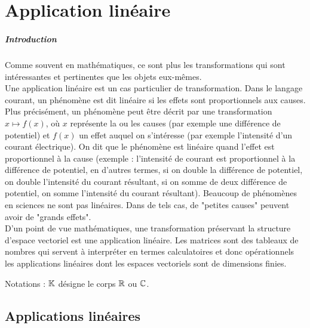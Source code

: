 \documentclass{book}
\begin{document}
\chapter*{Application linéaire}
\paragraph{Introduction}
Comme souvent en mathématiques, ce sont plus les transformations qui sont intéressantes et pertinentes que les objets eux-mêmes.\\
Une application linéaire est un cas particulier de transformation.  Dans le langage courant, un phénomène est dit linéaire si les
effets sont proportionnels aux causes. \\
Plus précisément, un phénomène peut être décrit par une transformation$x \mapsto f (x)$, où $x$ représente la ou les causes (par exemple une différence de
potentiel) et $f(x)$ un effet auquel on s'intéresse (par exemple l'intensité
d'un courant électrique). On dit que le phénomène est linéaire quand  l'effet est proportionnel à la cause (exemple : l'intensité de courant est
proportionnel à la différence de potentiel, en d'autres termes, si on double
la différence de potentiel, on double l'intensité du courant résultant, si on somme de deux différence de potentiel, on somme l'intensité du courant résultant).
Beaucoup de phénomènes en sciences ne sont pas linéaires. Dans de tels
cas, de "petites causes" peuvent avoir de "grands effets".\\
D'un point de vue mathématiques, une
transformation préservant la structure d'espace vectoriel est une application linéaire.  Les matrices sont des tableaux de nombres qui servent à interpréter en termes calculatoires et donc opérationnels les applications linéaires dont les espaces vectoriels sont de dimensions finies. 


Notations : $\mathbb{K} $ désigne le corps $\mathbb{R} $ ou $\mathbb{C} $.

\section{Applications linéaires}
\end{document}
